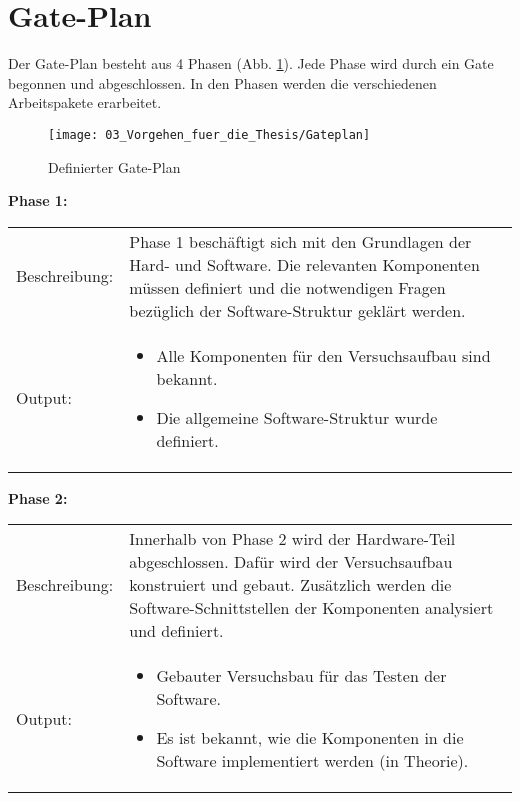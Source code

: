 \section{Gate-Plan} \label{Gate-Plan}

	Der Gate-Plan besteht aus 4 Phasen (Abb. \ref{fig:Gateplan}). Jede Phase wird durch ein Gate begonnen und abgeschlossen. In den Phasen werden die verschiedenen Arbeitspakete erarbeitet. 

	\begin{figure}[h!]
		\centering
		\texttt{[image: 03\_Vorgehen\_fuer\_die\_Thesis/Gateplan]}
		\captionsetup{justification=centering}
		\caption{Definierter Gate-Plan}
		\label{fig:Gateplan}
	\end{figure}
	
	\textbf{Phase 1:} \vspace{2mm} 
	\\
		\begin{tabularx}{\textwidth}{@{}>{}p{7em} X@{}}
			Beschreibung: & 
			Phase 1 beschäftigt sich mit den Grundlagen der Hard- und Software. Die relevanten Komponenten müssen definiert und die notwendigen Fragen bezüglich der Software-Struktur geklärt werden.
			\\
			
			Output: & 
			\begin{itemize}
				\item Alle Komponenten für den Versuchsaufbau sind bekannt.
				\item Die allgemeine Software-Struktur wurde definiert.
			\end{itemize}
		\end{tabularx}
	
	\textbf{Phase 2:} \vspace{2mm} 
	\\
		\begin{tabularx}{\textwidth}{@{}>{}p{7em} X@{}}
			Beschreibung: & 
			Innerhalb von Phase 2 wird der Hardware-Teil abgeschlossen. Dafür wird der Versuchsaufbau konstruiert und gebaut. Zusätzlich werden die Software-Schnittstellen der Komponenten analysiert und definiert. 
			\\
			
			Output: & 
			\begin{itemize}
				\item Gebauter Versuchsbau für das Testen der Software.
				\item Es ist bekannt, wie die Komponenten in die Software implementiert werden (in Theorie).
			\end{itemize}
		\end{tabularx}
	
